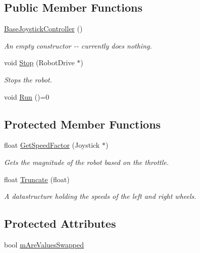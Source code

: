 \subsection*{\-Public \-Member \-Functions}
\begin{DoxyCompactItemize}
\item 
\hyperlink{class_base_joystick_controller_a47fca3d26986a9ae18f9748be8fdf5da}{\-Base\-Joystick\-Controller} ()
\begin{DoxyCompactList}\small\item\em \-An empty constructor -\/-\/ currently does nothing. \end{DoxyCompactList}\item 
void \hyperlink{class_base_joystick_controller_a0c7c65553c0bbd68fff1fdc69c00aa77}{\-Stop} (\-Robot\-Drive $\ast$)
\begin{DoxyCompactList}\small\item\em \-Stops the robot. \end{DoxyCompactList}\item 
void \hyperlink{class_base_joystick_controller_a8da5328dc760aa08edade5adb793d0c4}{\-Run} ()=0
\end{DoxyCompactItemize}
\subsection*{\-Protected \-Member \-Functions}
\begin{DoxyCompactItemize}
\item 
float \hyperlink{class_base_joystick_controller_aabe47242ff9d1c8ce3e5c85892f118c9}{\-Get\-Speed\-Factor} (\-Joystick $\ast$)
\begin{DoxyCompactList}\small\item\em \-Gets the magnitude of the robot based on the throttle. \end{DoxyCompactList}\item 
float \hyperlink{class_base_joystick_controller_afdf35242ad43223a083e232fa9d1ac2a}{\-Truncate} (float)
\begin{DoxyCompactList}\small\item\em \-A datastructure holding the speeds of the left and right wheels. \end{DoxyCompactList}\end{DoxyCompactItemize}
\subsection*{\-Protected \-Attributes}
\begin{DoxyCompactItemize}
\item 
bool \hyperlink{class_base_joystick_controller_a57b2686f5181fc4af7df37dd847d59fb}{m\-Are\-Values\-Swapped}
\end{DoxyCompactItemize}
